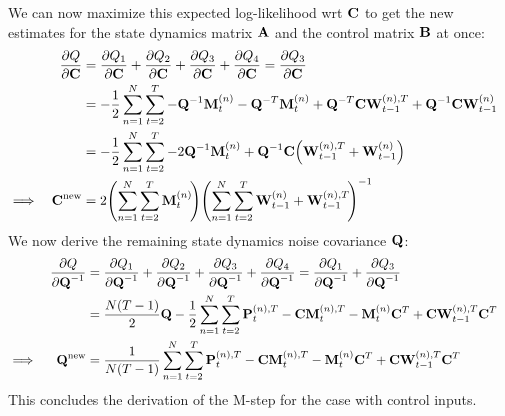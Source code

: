 		We can now maximize this expected log-likelihood \ac{wrt} \(\mat{C}\) to get the new estimates for the state dynamics matrix \(\mat{A}\) and the control matrix \(\mat{B}\) at once:
		\begin{align*}
			&& \pdv{Q}{\mat{C}}
				&= \pdv{Q_1}{\mat{C}} + \pdv{Q_2}{\mat{C}} + \pdv{Q_3}{\mat{C}} + \pdv{Q_4}{\mat{C}} = \pdv{Q_3}{\mat{C}} & \\
			&&	&= -\frac{1}{2} \sum_{n = 1}^{N} \sum_{t = 2}^{T} -\mat{Q}^{-1} \mat{M}_t^{(n)} - \mat{Q}^{-T} \mat{M}_t^{(n)} + \mat{Q}^{-T} \mat{C} \mat{W}_{t - 1}^{(n), T} + \mat{Q}^{-1} \mat{C} \mat{W}_{t - 1}^{(n)} & \\
			&&	&= -\frac{1}{2} \sum_{n = 1}^{N} \sum_{t = 2}^{T} -2\mat{Q}^{-1} \mat{M}_t^{(n)} + \mat{Q}^{-1} \mat{C} \Big( \mat{W}_{t - 1}^{(n), T} + \mat{W}_{t - 1}^{(n)} \Big) & \\
			\implies && \mat{C}^\new &= 2 \Bigg(\! \sum_{n = 1}^{N} \sum_{t = 2}^{T} \mat{M}_t^{(n)} \!\Bigg) \Bigg(\! \sum_{n = 1}^{N} \sum_{t = 2}^{T} \mat{W}_{t - 1}^{(n)} + \mat{W}_{t - 1}^{(n), T} \!\Bigg)^{-1} &
		\end{align*}
		We now derive the remaining state dynamics noise covariance \(\mat{Q}\):
		\begin{align*}
			&& \pdv{Q}{\mat{Q}^{-1}}
				&= \pdv{Q_1}{\mat{Q}^{-1}} + \pdv{Q_2}{\mat{Q}^{-1}} + \pdv{Q_3}{\mat{Q}^{-1}} + \pdv{Q_4}{\mat{Q}^{-1}} = \pdv{Q_1}{\mat{Q}^{-1}} + \pdv{Q_3}{\mat{Q}^{-1}} & \\
			&&	&= \frac{N (T - 1)}{2} \mat{Q} - \frac{1}{2} \sum_{n = 1}^{N} \sum_{t = 2}^{T} \mat{P}_t^{(n), T} - \mat{C} \mat{M}_t^{(n), T} - \mat{M}_t^{(n)} \mat{C}^T + \mat{C} \mat{W}_{t - 1}^{(n), T} \mat{C}^T & \\
			\implies && \mat{Q}^\new &= \frac{1}{N (T - 1)} \sum_{n = 1}^{N} \sum_{t = 2}^{T} \mat{P}_t^{(n), T} - \mat{C} \mat{M}_t^{(n), T} - \mat{M}_t^{(n)} \mat{C}^T + \mat{C} \mat{W}_{t - 1}^{(n), T} \mat{C}^T &
		\end{align*}
		This concludes the derivation of the M-step for the case with control inputs.















